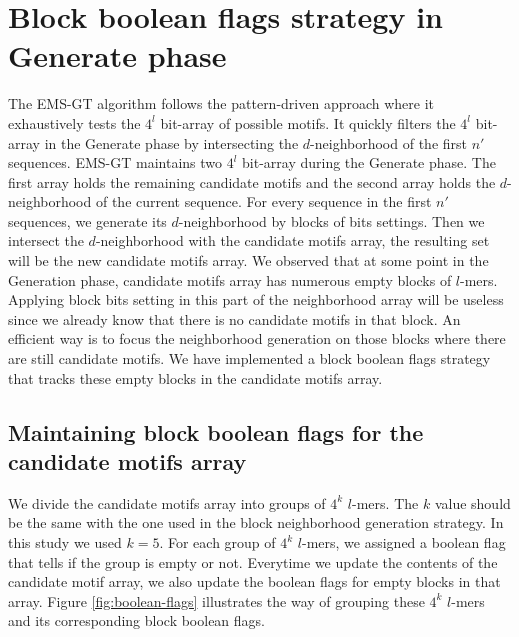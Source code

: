 \section{Block boolean flags strategy in Generate phase}

The EMS-GT algorithm follows the pattern-driven approach where it exhaustively tests the $4^l$ bit-array of possible motifs. It quickly filters the $4^l$ bit-array in the Generate phase by intersecting the $d$-neighborhood of the first $n'$ sequences. EMS-GT maintains two $4^l$ bit-array during the Generate phase. The first array holds the remaining candidate motifs and the second array holds the $d$-neighborhood of the current sequence. For every sequence in the first $n'$ sequences, we generate its $d$-neighborhood by blocks of bits settings. Then we intersect the $d$-neighborhood with the candidate motifs array, the resulting set will be the new candidate motifs array. We observed that at some point in the Generation phase, candidate motifs array has numerous empty blocks of $l$-mers. Applying block bits setting in this part of the neighborhood array will be useless since we already know that there is no candidate motifs in that block. An efficient way is to focus the neighborhood generation on those blocks where there are still candidate motifs. We have implemented a block boolean flags strategy that tracks these empty blocks in the candidate motifs array.

\subsection{Maintaining block boolean flags for the candidate motifs array}
We divide the candidate motifs array into groups of $4^k$ $l$-mers. The $k$ value should be the same with the one used in the block neighborhood generation strategy. In this study we used $k = 5$. For each group of $4^k$ $l$-mers, we assigned a boolean flag that tells if the group is empty or not. Everytime we update the contents of the candidate motif array, we also update the boolean flags for empty blocks in that array. Figure \ref{fig:boolean-flags} illustrates the way of grouping these $4^k$ $l$-mers and its corresponding block boolean flags.




